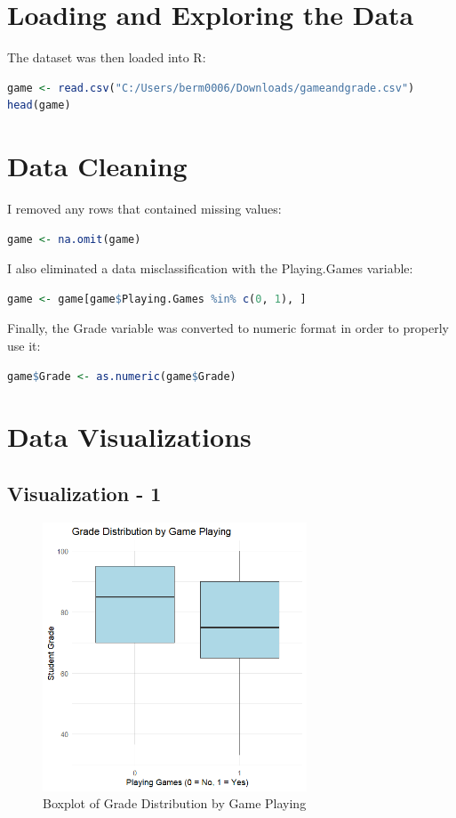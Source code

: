 \documentclass{article}
\begin{document}
\section{Loading and Exploring the Data}
The dataset was then loaded into R:

\begin{lstlisting}[language=R]
game <- read.csv("C:/Users/berm0006/Downloads/gameandgrade.csv")
head(game)
\end{lstlisting}

\section{Data Cleaning}
I removed any rows that contained missing values:

\begin{lstlisting}[language=R]
game <- na.omit(game)
\end{lstlisting}

I also eliminated a data misclassification with the Playing.Games variable:

\begin{lstlisting}[language=R]
game <- game[game$Playing.Games %in% c(0, 1), ]
\end{lstlisting}

Finally, the Grade variable was converted to numeric format in order to properly use it:

\begin{lstlisting}[language=R]
game$Grade <- as.numeric(game$Grade)
\end{lstlisting}

\section{Data Visualizations}

\subsection{Visualization - 1}

\begin{figure}[h]
    \centering
    \includegraphics[width=0.7\textwidth]{PS6a_Bermudez.png}
    \caption{Boxplot of Grade Distribution by Game Playing}
    \label{fig:grade_distribution1}
\end{figure}
\end{document}

